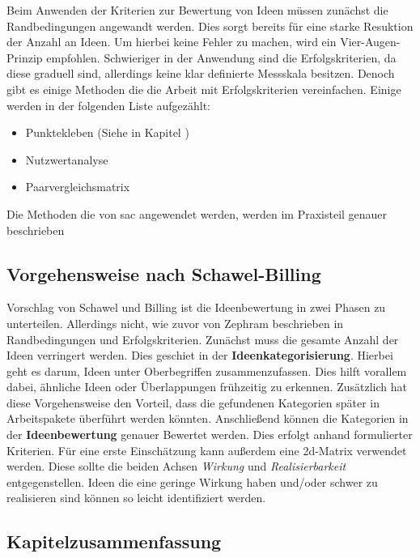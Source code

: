 Beim Anwenden der Kriterien zur Bewertung von Ideen müssen zunächst die Randbedingungen angewandt werden. 
Dies sorgt bereits für eine starke Resuktion der Anzahl an Ideen. Um hierbei keine Fehler zu machen, wird 
ein Vier-Augen-Prinzip empfohlen. 
Schwieriger in der Anwendung sind die Erfolgskriterien, da diese graduell sind, allerdings keine klar definierte Messskala 
besitzen. Denoch gibt es einige Methoden die die Arbeit mit Erfolgskriterien vereinfachen. Einige werden 
in der folgenden Liste aufgezählt: 
\begin{itemize}
    \item Punktekleben (Siehe in Kapitel )
    \item Nutzwertanalyse
    \item Paarvergleichsmatrix
\end{itemize}
Die Methoden die von \ac{sac} angewendet werden, werden im Praxisteil genauer beschrieben

\cite{zephram:2018}

\subsection{Vorgehensweise nach Schawel-Billing}
Vorschlag von Schawel und Billing ist die Ideenbewertung in zwei Phasen zu unterteilen. Allerdings nicht, 
wie zuvor von Zephram beschrieben in Randbedingungen und Erfolgskriterien. Zunächst muss die gesamte Anzahl 
der Ideen verringert werden. Dies geschiet in der \textbf{Ideenkategorisierung}. Hierbei geht es darum, Ideen unter 
Oberbegriffen zusammenzufassen. Dies hilft vorallem dabei, ähnliche Ideen oder Überlappungen frühzeitig zu erkennen.
Zusätzlich hat diese Vorgehensweise den Vorteil, dass die gefundenen Kategorien später in Arbeitspakete überführt werden 
könnten. Anschließend können die Kategorien in der \textbf{Ideenbewertung} genauer Bewertet werden. 
Dies erfolgt anhand formulierter Kriterien. Für eine erste Einschätzung kann außerdem eine \ac{2d}-Matrix verwendet werden. 
Diese sollte die beiden Achsen \textit{Wirkung} und \textit{Realisierbarkeit} entgegenstellen. Ideen die eine geringe Wirkung haben und/oder 
schwer zu realisieren sind können so leicht identifiziert werden. 
\cite{schawel:2009}
\subsection{Kapitelzusammenfassung}
